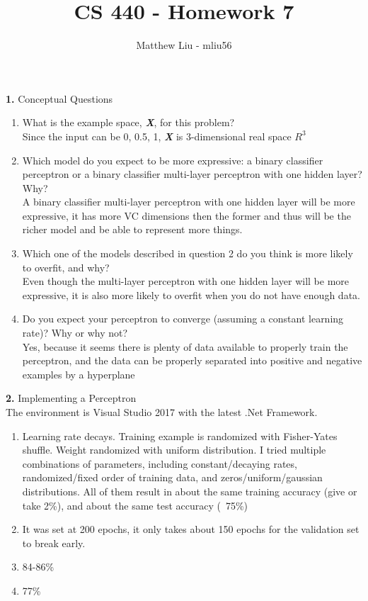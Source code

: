 \documentclass[titlepage]{article}
\title{CS 440 - Homework 7}
\author{Matthew Liu - mliu56}
\date{}
\begin{document}
\maketitle{}

\noindent \textbf{1. } Conceptual Questions \\

\begin{enumerate}
	\item What is the example space, \textbf{\textit{X}}, for this problem? \\
	Since the input can be {0, 0.5, 1}, \textbf{\textit{X}} is 3-dimensional real space $R^3$
	\item Which model do you expect to be more expressive: a binary classifier perceptron or a binary classifier multi-layer perceptron with one hidden layer? Why? \\
	A binary classifier multi-layer perceptron with one hidden layer will be more expressive, it has more VC dimensions then the former and thus will be the richer model and be able to represent more things.
	\item Which one of the models described in question 2 do you think is more likely to overfit, and why? \\
	Even though the multi-layer perceptron with one hidden layer will be more expressive, it is also more likely to overfit when you do not have enough data.
	\item Do you expect your perceptron to converge (assuming a constant learning rate)? Why or why not? \\
	Yes, because it seems there is plenty of data available to properly train the perceptron, and the data can be properly separated into positive and negative examples by a hyperplane
\end{enumerate}

\noindent \textbf{2. } Implementing a Perceptron \\

The environment is Visual Studio 2017 with the latest .Net Framework.

\begin{enumerate}
	\item Learning rate decays. Training example is randomized with Fisher-Yates shuffle. Weight randomized with uniform distribution. I tried multiple combinations of parameters, including constant/decaying rates, randomized/fixed order of training data, and zeros/uniform/gaussian distributions. All of them result in about the same training accuracy (give or take 2\%), and about the same test accuracy (~75\%)
	\item It was set at 200 epochs, it only takes about 150 epochs for the validation set to break early.
	\item 84-86\%
	\item 77\%
\end{enumerate}
\end{document}
